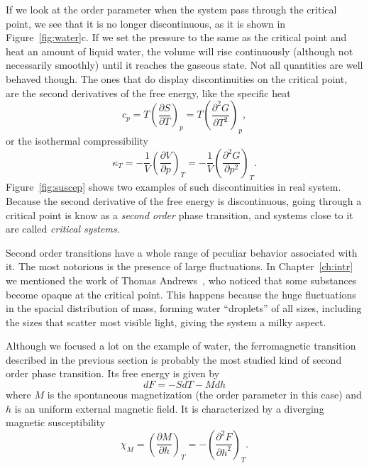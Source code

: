If we look at the order parameter when the system pass through the critical
point, we see that it is no longer discontinuous, as it is shown in
Figure~\ref{fig:water}c. If we set the pressure to the same as the critical
point and heat an amount of liquid water, the volume will rise continuously
(although not necessarily smoothly) until it reaches the gaseous state. Not all
quantities are well behaved though. The ones that do display discontinuities on
the critical point, are the second derivatives of the free energy, like the
specific heat
\begin{equation}
    c_p=T{\left(\frac{\partial S}{\partial T}\right)}_{p}=
    T{\left(\frac{\partial^{2}G}{\partial T^{2}}\right)}_{p},
\end{equation}
or the isothermal compressibility
\begin{equation}
    \kappa_T=-\frac{1}{V}{\left(\frac{\partial V}{\partial p}\right)}_{T}=
    -\frac{1}{V}{\left(\frac{\partial^{2}G}{\partial p^{2}}\right)}_{T}.
\end{equation}
Figure~\ref{fig:suscep} shows two examples of such discontinuities in real
system. Because the second derivative of the free energy is discontinuous,
going through a critical point is know as a \textit{second order} phase
transition, and systems close to it are called \textit{critical systems}.

Second order transitions have a whole range of peculiar behavior associated
with it. The most notorious is the presence of large fluctuations. In
Chapter~\ref{ch:intr} we mentioned the work of Thomas
Andrews~\cite{Andrews1869}, who noticed that some substances become opaque at
the critical point. This happens because the huge fluctuations in the spacial
distribution of mass, forming water ``droplets'' of all sizes, including the
sizes that scatter most visible light, giving the system a milky aspect.

Although we focused a lot on the example of water, the ferromagnetic transition
described in the previous section is probably the most studied kind of second
order phase transition. Its free energy is given by
\begin{equation}
    dF = -SdT-Mdh
\end{equation}
where $M$ is the spontaneous magnetization (the order parameter in this case)
and $h$ is an uniform external magnetic field. It is characterized by a
diverging magnetic susceptibility
\begin{equation}
    \chi_{M}=
    {\left(\frac{\partial M}{\partial h}\right)}_{T}=
    -{\left(\frac{\partial^{2}F}{\partial h^{2}}\right)}_{T}.
\end{equation}

